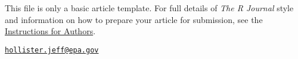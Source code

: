 This file is only a basic article template. For full details of
\emph{The R Journal} style and information on how to prepare your
article for submission, see the
\href{https://journal.r-project.org/share/author-guide.pdf}{Instructions
for Authors}.



\address{%
Jeffrey W. Hollister\\
U.S. Environmental Protection Agency\\
Office of Research and Development\\ National Health and Environmental Effects Research Laboratory\\ Atlantic Ecology Division\\ 27 Tarzwell Drive\\ Narragansett, RI 02882\\
}
\href{mailto:hollister.jeff@epa.gov}{\nolinkurl{hollister.jeff@epa.gov}}

